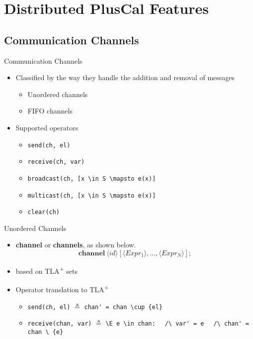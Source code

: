 \documentclass{beamer}
\newcommand\tab[1][1cm]{\hspace*{#1}}
\newcommand{\tlaplus}{TLA\textsuperscript{+}\xspace}
\newcommand{\keyword}[1]{\textbf{#1}}
\newcommand{\entity}[1]{\ensuremath{\langle}#1\ensuremath{\rangle}}
\begin{document}
\section{Distributed PlusCal Features}

\subsection{Communication Channels}

\begin{frame}[fragile]{Communication Channels}
    \begin{itemize}
        \item Classified by the way they handle the addition and removal of messages 
            \begin{itemize}
                \item Unordered channels 
                \item FIFO channels 
            \end{itemize}
     \item Supported operators 
            \begin{itemize}
                \item \verb|send(ch, el)|
                \item \verb|receive(ch, var)|
                \item \verb|broadcast(ch, [x \in S \mapsto e(x)]| 
                \item \verb|multicast(ch, [x \in S \mapsto e(x)]|
                \item \verb|clear(ch)|
            \end{itemize}

    \end{itemize}
\end{frame}

\begin{frame}[fragile]{Unordered Channels}
    \begin{itemize}
        \item \keyword{channel} or \keyword{channels}, as shown below.
        \[
            \keyword{channel}\ \entity{id}[\entity{Expr_1},\dots,\entity{Expr_N}];
        \]
         \item based on \tlaplus sets
     \item Operator translation to \tlaplus
            \begin{itemize}
                \item \verb|send(ch, el)| $\triangleq$
                \verb|chan' = chan \cup {el}| 
                \newline
                \item \verb|receive(chan, var)| $\triangleq$
                      \verb|\E e \in chan:| \newline \tab\tab\tab\tab
                         \verb|  /\ var' = e|\newline \tab\tab\tab\tab
                         \verb|  /\ chan' =  chan \ {e}|
            \end{itemize}

    \end{itemize}
\end{frame}
\end{document}
